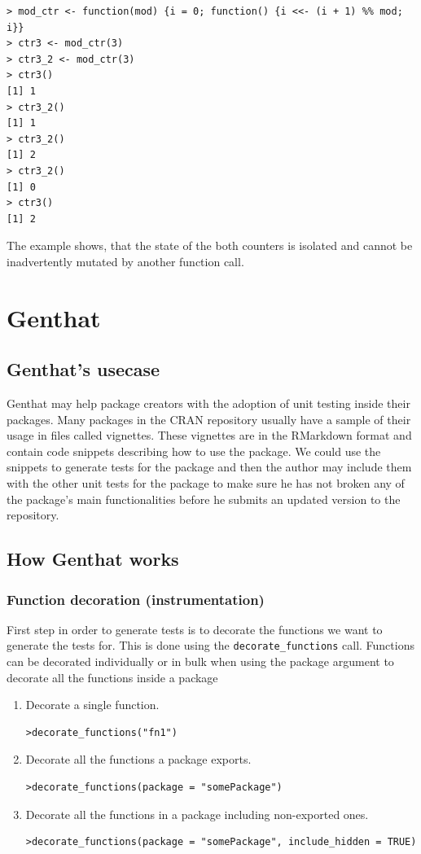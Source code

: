 \documentclass[thesis=B,english]{FITthesis}[2012/10/20]
\begin{document}
\begin{verbatim}
> mod_ctr <- function(mod) {i = 0; function() {i <<- (i + 1) %% mod; i}}
> ctr3 <- mod_ctr(3)
> ctr3_2 <- mod_ctr(3)
> ctr3()
[1] 1
> ctr3_2()
[1] 1
> ctr3_2()
[1] 2
> ctr3_2()
[1] 0
> ctr3()
[1] 2
\end{verbatim}

The example shows, that the state of the both counters is isolated and cannot be inadvertently mutated by another function call.

\chapter{Genthat} \label{chap:genthat}
\section{Genthat’s usecase}
Genthat may help package creators with the adoption of unit testing inside their packages. Many packages in the CRAN repository usually have a sample of their usage in files called vignettes. These vignettes are in the RMarkdown format and contain code snippets describing how to use the package. We could use the snippets to generate tests for the package and then the author may include them with the other unit tests for the package to make sure he has not broken any of the package’s main functionalities before he submits an updated version to the repository.

\section{How Genthat works}
\subsection{Function decoration (instrumentation)}
First step in order to generate tests is to decorate the functions we want to generate the tests for. This is done using the \verb|decorate_functions| call. Functions can be decorated individually or in bulk when using the package argument to decorate all the functions inside a package

\begin{enumerate}
\item Decorate a single function.
\begin{verbatim}
>decorate_functions("fn1")
\end{verbatim}
\item Decorate all the functions a package exports.
\begin{verbatim}
>decorate_functions(package = "somePackage")
\end{verbatim}
\item Decorate all the functions in a package including non-exported ones.
\begin{verbatim}
>decorate_functions(package = "somePackage", include_hidden = TRUE)
\end{verbatim}
\end{enumerate}
\end{document}
